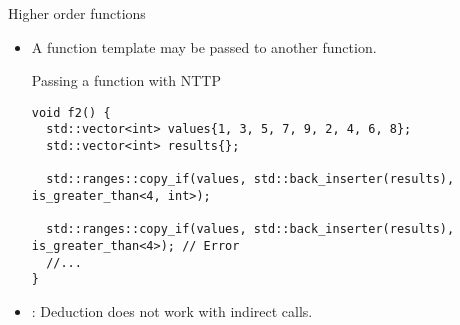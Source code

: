 \begin{frame}[t,fragile]{Higher order functions}
\begin{itemize}
  \item A function template may be passed to another function.

\begin{block}{Passing a function with NTTP}
\begin{lstlisting}
void f2() {
  std::vector<int> values{1, 3, 5, 7, 9, 2, 4, 6, 8}; 
  std::vector<int> results{};

  std::ranges::copy_if(values, std::back_inserter(results), is_greater_than<4, int>);

  std::ranges::copy_if(values, std::back_inserter(results), is_greater_than<4>); // Error
  //...
}
\end{lstlisting}
\end{block}

  \item {}: Deduction does not work with indirect calls.

\end{itemize}
\end{frame}


